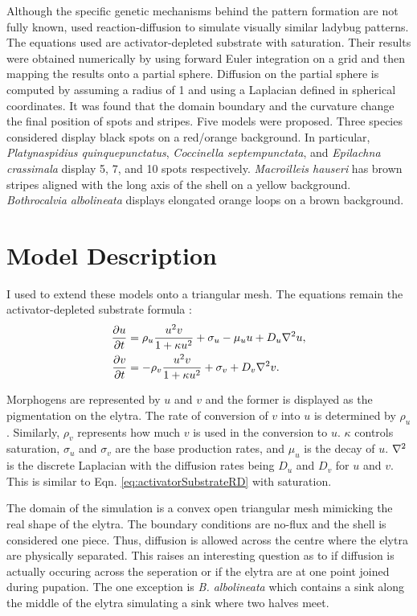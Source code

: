 Although the specific genetic mechanisms behind the pattern formation are not fully known, \citet{Liaw2001} used reaction-diffusion to simulate visually similar ladybug patterns. The equations used are activator-depleted substrate with saturation. Their results were obtained numerically by using forward Euler integration on a grid and then mapping the results onto a partial sphere. Diffusion on the partial sphere is computed by assuming a radius of 1 and using a Laplacian defined in spherical coordinates. It was found that the domain boundary and the curvature change the final position of spots and stripes. Five models were proposed. Three species considered display black spots on a red/orange background. In particular, \textit{Platynaspidius quinquepunctatus}, \textit{Coccinella septempunctata}, and \textit{Epilachna crassimala} display 5, 7, and 10 spots respectively. \textit{Macroilleis hauseri} has brown stripes aligned with the long axis of the shell on a yellow background. \textit{Bothrocalvia albolineata} displays elongated orange loops on a brown background.

\section{Model Description} 
I used \ProgramName{} to extend these models onto a triangular mesh. The equations remain the activator-depleted substrate formula \citep{meinhardt1982}:
\begin{equation}
	\begin{aligned} \label{eq:ladybugRD}
   \frac{\partial u}{\partial t} &= \rho_u \frac{u^2v}{1+\kappa u^2} + \sigma_u - \mu_u u + D_u \nabla^2 u, \\
   \frac{\partial v}{\partial t} &= -\rho_v \frac{u^2v}{1+\kappa u^2} + \sigma_v + D_v \nabla^2 v.
	\end{aligned}
\end{equation}

Morphogens are represented by $u$ and $v$ and the former is displayed as the pigmentation on the elytra. The rate of conversion of $v$ into $u$ is determined by $\rho_u$. Similarly, $\rho_v$ represents how much $v$ is used in the conversion to $u$. $\kappa$ controls saturation, $\sigma_u$ and $\sigma_v$ are the base production rates, and $\mu_u$ is the decay of $u$. $\nabla^2$ is the discrete Laplacian with the diffusion rates being $D_u$ and $D_v$ for $u$ and $v$. This is similar to Eqn. \ref{eq:activatorSubstrateRD} with saturation.

The domain of the simulation is a convex open triangular mesh mimicking the real shape of the elytra. The boundary conditions are no-flux and the shell is considered one piece. Thus, diffusion is allowed across the centre where the elytra are physically separated. This raises an interesting question as to if diffusion is actually occuring across the seperation or if the elytra are at one point joined during pupation. The one exception is \textit{B. albolineata} which contains a sink along the middle of the elytra simulating a sink where two halves meet.

